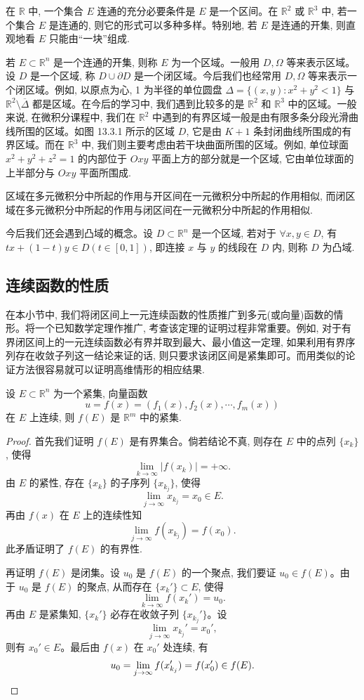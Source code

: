 在 $\mathbb R$ 中, 一个集合 $E$ 连通的充分必要条件是 $E$ 是一个区间。在 $\mathbb R^2$ 或 $\mathbb R^3$ 中, 若一个集合 $E$ 是连通的, 则它的形式可以多种多样。特别地, 若 $E$ 是连通的开集, 则直观地看 $E$ 只能由``一块''组成.

若 $E\subset\mathbb R^n$ 是一个连通的开集, 则称 $E$ 为一个区域。一般用 $D,\Omega$ 等来表示区域。设 $D$ 是一个区域, 称 $D\cup\partial D$ 是一个闭区域。今后我们也经常用 $D,\Omega$ 等来表示一个闭区域。例如, 以原点为心, 1 为半径的单位圆盘 $\Delta=\{(x,y):x^2+y^2<1\}$ 与 $\mathbb R^2\setminus\overline\Delta$ 都是区域。在今后的学习中, 我们遇到比较多的是 $\mathbb R^2$ 和 $\mathbb R^3$ 中的区域。一般来说, 在微积分课程中, 我们在 $\mathbb R^2$ 中遇到的有界区域一般是由有限多条分段光滑曲线所围的区域。如图 13.3.1 所示的区域 $D$, 它是由 $K+1$ 条封闭曲线所围成的有界区域。而在 $\mathbb R^3$ 中, 我们则主要考虑由若干块曲面所围的区域。例如, 单位球面 $x^2+y^2+z^2=1$ 的内部位于 $Oxy$ 平面上方的部分就是一个区域, 它由单位球面的上半部分与 $Oxy$ 平面所围成.

区域在多元微积分中所起的作用与开区间在一元微积分中所起的作用相似, 而闭区域在多元微积分中所起的作用与闭区间在一元微积分中所起的作用相似.

今后我们还会遇到凸域的概念。设 $D\subset\mathbb R^n$ 是一个区域, 若对于 $\forall x,y\in D$, 有 $tx+(1-t)y\in D(t\in[0,1])$, 即连接 $x$ 与 $y$ 的线段在 $D$ 内, 则称 $D$ 为凸域.

\subsection{连续函数的性质}
\label{subsec:ma-13-3-4}

在本小节中, 我们将闭区间上一元连续函数的性质推广到多元(或向量)函数的情形。将一个已知数学定理作推广, 考查该定理的证明过程非常重要。例如, 对于有界闭区间上的一元连续函数必有界并取到最大、最小值这一定理, 如果利用有界序列存在收敛子列这一结论来证的话, 则只要求该闭区间是紧集即可。而用类似的论证方法很容易就可以证明高维情形的相应结果.

\begin{theorem}\label{theorem:ma-13-3-2}
设 $E\subset\mathbb R^n$ 为一个紧集, 向量函数
\[
  u=f(x)=(f_1(x),f_2(x),\cdots,f_m(x))
\]
在 $E$ 上连续, 则 $f(E)$ 是 $\mathbb R^m$ 中的紧集.
\end{theorem}


\begin{proof}
首先我们证明 $f(E)$ 是有界集合。倘若结论不真, 则存在 $E$ 中的点列 $\{x_k\}$, 使得
\[
  \lim_{k\to\infty}|f(x_k)|=+\infty.
\]
由 $E$ 的紧性, 存在 $\{x_k\}$ 的子序列 $\{x_{k_j}\}$, 使得
\[
  \lim_{j\to\infty}x_{k_j}=x_0\in E.
\]
再由 $f(x)$ 在 $E$ 上的连续性知
\[
  \lim_{j\to\infty}f(x_{k_j})=f(x_0).
\]
此矛盾证明了 $f(E)$ 的有界性.

再证明 $f(E)$ 是闭集。设 $u_0$ 是 $f(E)$ 的一个聚点, 我们要证 $u_0\in f(E)$。由于 $u_0$ 是 $f(E)$ 的聚点, 从而存在 $\{x_k'\}\subset E$, 使得
\[
  \lim_{k\to\infty}f(x_k')=u_0.
\]
再由 $E$ 是紧集知, $\{x_k'\}$ 必存在收敛子列 $\{x_{k_j}'\}$。设
\[
  \lim_{j\to\infty}x_{k_j}'=x_0',
\]
则有 $x_0'\in E$。最后由 $f(x)$ 在 $x_0'$ 处连续, 有
\[
  u_0=\lim_{j\to\infty}f(x_{k_j}')=f(x_0')\in f(E).
\qedhere
\]
\end{proof}


